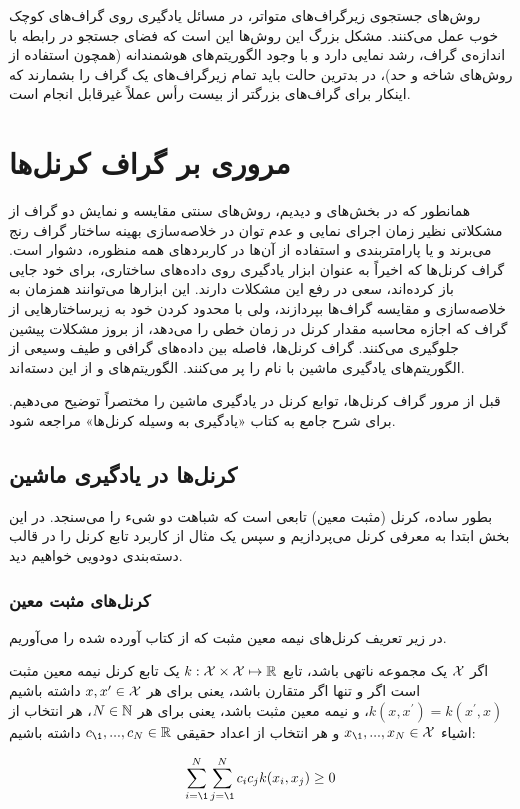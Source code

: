 روش‌های جستجوی زیرگراف‌های متواتر، در مسائل یادگیری روی گراف‌های کوچک خوب عمل می‌کنند. مشکل بزرگ این روش‌ها این است که فضای جستجو در رابطه با اندازه‌ی گراف، رشد نمایی دارد و با وجود الگوریتم‌های هوشمندانه (همچون استفاده از روش‌های شاخه و حد)، در بدترین حالت باید تمام زیرگراف‌های یک گراف را بشمارند که اینکار برای گراف‌های بزرگتر از بیست رأس عملاً غیرقابل انجام است.

\section{مروری بر گراف کرنل‌ها}\label{sec:graph-kernels-review}
همانطور که در بخش‌های  و  دیدیم، روش‌های سنتی مقایسه و نمایش دو گراف از مشکلاتی نظیر زمان اجرای نمایی و عدم توان در خلاصه‌سازی بهینه ساختار گراف رنج می‌برند و یا پارامتربندی و استفاده از آن‌ها در کاربردهای همه منظوره، دشوار است. گراف کرنل‌ها که اخیراً به عنوان ابزار یادگیری روی داده‌های ساختاری، برای خود جایی باز کرده‌اند، سعی در رفع این مشکلات دارند. این ابزارها می‌توانند همزمان به خلاصه‌سازی و مقایسه گراف‌ها بپردازند، ولی با محدود کردن خود به زیرساختارهایی از گراف که اجازه محاسبه مقدار کرنل در زمان خطی را می‌دهد، از بروز مشکلات پیشین جلوگیری می‌کنند. گراف کرنل‌ها، فاصله بین داده‌های گرافی و طیف وسیعی از الگوریتم‌های یادگیری ماشین با نام  را پر می‌کنند. الگوریتم‌های  و  از این دسته‌اند.

قبل از مرور گراف کرنل‌ها، توابع کرنل در یادگیری ماشین را مختصراً توضیح می‌دهیم. برای شرح جامع به کتاب «یادگیری به وسیله کرنل‌ها» مراجعه شود.

\subsection{کرنل‌ها در یادگیری ماشین}
بطور ساده، کرنل (مثبت معین) تابعی است که شباهت دو شیء را می‌سنجد. در این بخش ابتدا به معرفی کرنل می‌پردازیم و سپس یک مثال از کاربرد تابع کرنل را در قالب دسته‌بندی دودویی خواهیم دید.

\subsubsection{کرنل‌های مثبت معین}\label{sec:positive-semidefinite-kernels}
در زیر تعریف کرنل‌های نیمه معین مثبت که از کتاب  آورده شده را می‌آوریم.
\begin{definition}
اگر $\mathcal{X}$ یک مجموعه ناتهی باشد، تابع $k: \mathcal{X} \times \mathcal{X} \mapsto \mathbb{R}$ یک تابع کرنل نیمه معین مثبت است اگر و تنها اگر متقارن باشد، یعنی برای هر $x,x^\prime \in \mathcal{X}$ داشته باشیم
$k(x,x^\prime) = k(x^\prime,x)$، و نیمه معین مثبت باشد، 
یعنی برای هر $N \in \mathbb{N}$، هر انتخاب از اشیاء $x_\1,...,x_N \in \mX$ و هر انتخاب از اعداد حقیقی $c_\1,...,c_N \in \R$ داشته باشیم:

\begin{equation*}
\sum_{i=\1}^{N}\sum_{j=\1}^{N}c_ic_jk(x_i,x_j) \geq 0
\end{equation*}
\end{definition}

